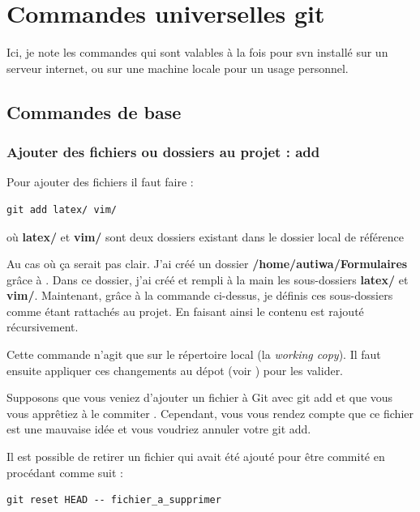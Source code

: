 \documentclass[a4paper,twoside]{article}
\begin{document}
\section{Commandes universelles git}
Ici, je note les commandes qui sont valables à la fois pour svn installé sur un serveur internet, ou sur une machine locale pour un usage personnel.

\subsection{Commandes de base}

\subsubsection{Ajouter des fichiers ou dossiers au projet : add} 
Pour ajouter des fichiers il faut faire :
\begin{verbatim}
git add latex/ vim/ 
\end{verbatim}
où \textbf{latex/} et \textbf{vim/} sont deux dossiers existant dans le dossier local de référence

\begin{remarque}
Au cas où ça serait pas clair. J'ai créé un dossier \textbf{/home/autiwa/Formulaires} grâce à . Dans ce dossier, j'ai créé et rempli à la main les sous-dossiers \textbf{latex/} et \textbf{vim/}. Maintenant, grâce à la commande ci-dessus, je définis ces sous-dossiers comme étant rattachés au projet. En faisant ainsi le contenu est rajouté récursivement.
\end{remarque}

\begin{attention}
Cette commande n'agit que sur le répertoire local (la \emph{working copy}). Il faut ensuite appliquer ces changements au dépot (voir ) pour les valider.
\end{attention}

\bigskip

Supposons que vous veniez d'ajouter un fichier à Git avec git add et que vous vous apprêtiez à le \og commiter \fg. Cependant, vous vous rendez compte que ce fichier est une mauvaise idée et vous voudriez annuler votre git add.

Il est possible de retirer un fichier qui avait été ajouté pour être \og commité \fg en procédant comme suit :
\begin{verbatim}
git reset HEAD -- fichier_a_supprimer
\end{verbatim}
\end{document}
